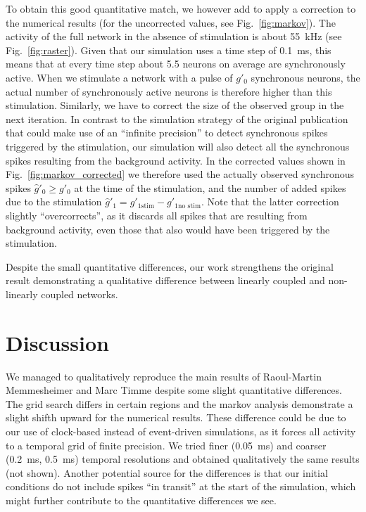\documentclass[10pt,a4paper,onecolumn]{article}
\begin{document}
To obtain this good quantitative match, we however add to apply a correction to the numerical results (for the uncorrected values, see Fig.~\ref{fig:markov}). The activity of the full network in the absence of stimulation is about \SI{55}{\kilo\hertz} (see Fig.~\ref{fig:raster}). Given that our simulation uses a time step of \SI{0.1}{\milli\second}, this means that at every time step about 5.5 neurons on average are synchronously active. When we stimulate a network with a pulse of $g'_0$ synchronous neurons, the actual number of synchronously active neurons is therefore higher than this stimulation. Similarly, we have to correct the size of the observed group in the next iteration. In contrast to the simulation strategy of the original publication that could make use of an ``infinite precision'' to detect synchronous spikes triggered by the stimulation, our simulation will also detect all the synchronous spikes resulting from the background activity. In the corrected values shown in Fig.~\ref{fig:markov_corrected} we therefore used the actually observed synchronous spikes $\hat{g}'_0 \geq g'_0$ at the time of the stimulation, and the number of added spikes due to the stimulation $\hat{g}'_1 = g'_{1 \text{stim}} - g'_{1 \text{no stim}}$. Note that the latter correction slightly ``overcorrects'', as it discards all spikes that are resulting from background activity, even those that also would have been triggered by the stimulation.

Despite the small quantitative differences, our work strengthens the original result demonstrating a qualitative difference between linearly coupled and non-linearly coupled networks.

\section*{Discussion}

We managed to qualitatively reproduce the main results of Raoul-Martin Memmes\-heimer and Marc Timme \cite{Memmesheimer2012} despite some slight quantitative differences. The grid search differs in certain regions and the markov analysis demonstrate a slight shifth upward for the numerical results. These difference could be due to our use of clock-based instead of event-driven simulations, as it forces all activity to a temporal grid of finite precision. We tried finer (\SI{0.05}{\milli\second}) and coarser (\SI{0.2}{\milli\second}, \SI{0.5}{\milli\second}) temporal resolutions and obtained qualitatively the same results (not shown). Another potential source for the differences is that our initial conditions do not include spikes ``in transit'' at the start of the simulation, which might further contribute to the quantitative differences we see.
\end{document}

